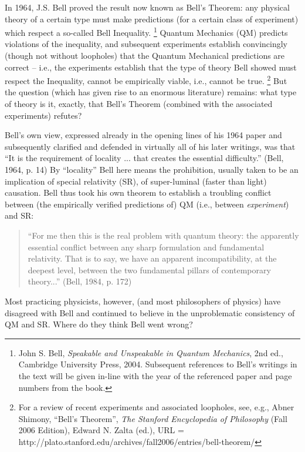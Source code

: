 \documentclass[12pt]{article}
\begin{document}
In 1964, J.S. Bell proved the result now known as Bell's
Theorem:  any physical theory of a certain
type must make predictions (for a certain class of experiment) which
respect a so-called Bell Inequality.%
\footnote{John S. Bell, \emph{Speakable and Unspeakable in Quantum
    Mechanics}, 2nd ed., Cambridge University Press, 2004.  Subsequent
  references to Bell's writings in the text will be given in-line with
  the year of the referenced paper and page numbers from the book.}
Quantum Mechanics (QM) predicts
violations of the inequality, and subsequent
experiments establish convincingly (though not without loopholes) that
the Quantum Mechanical predictions are correct -- i.e., the
experiments establish that 
the type of theory Bell showed must respect the Inequality, cannot be
empirically viable, i.e., cannot be true.%
\footnote{For a review of recent experiments and associated loopholes,
  see, e.g., Abner Shimony, ``Bell's Theorem'', \emph{The Stanford
  Encyclopedia of Philosophy} (Fall 2006 Edition), Edward N. Zalta
(ed.), URL = http://plato.stanford.edu/archives/fall2006/entries/bell-theorem/}
But the
question (which has given rise to an enormous literature) remains:
what type of theory is it, exactly, that Bell's Theorem (combined with
the associated experiments) refutes?

Bell's own view, expressed already in the opening lines of his 1964
paper and subsequently clarified and defended in virtually all of his
later writings, was that ``It is the requirement of locality ...
that creates the essential difficulty.''  (Bell, 1964, p. 14)
By ``locality'' Bell here means 
the prohibition, usually taken to be an implication of
special relativity (SR), of super-luminal (faster than light) 
causation.  Bell thus 
took his own theorem to establish a troubling conflict between (the
empirically verified predictions of) QM (i.e.,
between \emph{experiment}) and SR:
\begin{quote}
``For me then this is the real problem with quantum theory:  the
apparently essential conflict between any sharp formulation and
fundamental relativity.  That is to say, we have an apparent
incompatibility, at the deepest level, between the two fundamental
pillars of contemporary theory...'' (Bell, 1984, p. 172)
\end{quote}
Most practicing physicists, however, (and most philosophers of
physics) have disagreed with Bell and continued to believe in the
unproblematic consistency of QM and SR.  Where do they think Bell went
wrong?  
\end{document}
